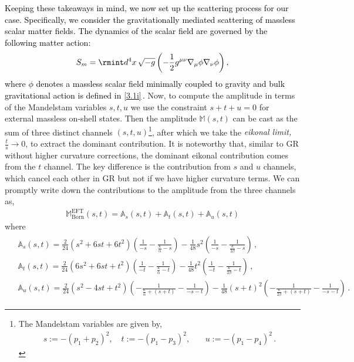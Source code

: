 \textcolor{black}{Keeping these takeaways in mind, we now set up the scattering process for our case. Specifically, we consider the gravitationally mediated scattering of massless scalar matter fields. The dynamics of the scalar field are governed by the following matter action:
\begin{align}
    S_{m} = \rmint d^4x\, \sqrt{-g} \left( -\frac{1}{2} g^{\mu\nu} \nabla_{\mu} \phi \nabla_{\nu} \phi \right),
\end{align}
where \(\phi\) denotes a massless scalar field minimally coupled to gravity and bulk gravitational action is defined in \eqref{3.1i}\,.
}
Now, to compute the amplitude in terms of the Mandelstam variables $s,t,u$ we use the constraint $s+t+u=0$ for external massless on-shell states. Then the amplitude $\mathbb{M}(s,t)$ can be cast as the sum of three distinct channels $(s,t,u)$\footnote{The Mandelstam variables are given by,
\begin{align}
s:=-(p_1+p_2)^2,\,\,\,\,\,\, t:=-(p_1-p_3)^2,\,\,\,\,\,\,\,\,\,\,\,u:=-(p_1-p_4)^2\,.
\end{align}
}, after which we take the \textit{eikonal limit, $\frac{t}{s}\rightarrow 0$}, to extract the dominant contribution.
It is noteworthy that, similar to GR without higher curvature corrections, the dominant eikonal contribution comes from the $t$ channel. The key difference is the contribution from $s$ and $u$ channels, which cancel each other in GR but not if we have higher curvature terms. We can promptly write down the  contributions to the amplitude from the three channels as,
\begin{align}
\mathbb{M}_{\text{Born}}^{\textrm{EFT}}(s,t)=\mathbb{A}_s(s,t)+\mathbb{A}_t(s,t)+\mathbb{A}_u(s,t)\nonumber
\end{align}
where
\begin{align}
\begin{split}
    &\mathbb{A}_s(s,t) =\frac{2}{24} \left(s^2+6 s t+6 t^2\right) \left(\frac{1}{-s}-\frac{1}{\frac{\kappa}{\alpha }-s}\right)-\frac{1}{48} s^2 \left(\frac{1}{-s}-\frac{1}{\frac{\kappa}{2 \beta }-s}\right)\,,\\&
\mathbb{A}_t(s,t)=\frac{2}{24} \left(6 s^2+6 s t+t^2\right) \left(\frac{1}{-t}-\frac{1}{\frac{\kappa}{\alpha }-t}\right)-\frac{1}{48} t^2 \left(\frac{1}{-t}-\frac{1}{\frac{\kappa}{2 \beta }-t}\right)\,,\\&
\mathbb{A}_u(s,t) =\frac{2}{24} \left(s^2-4 s t+t^2\right) \left(-\frac{1}{\frac{\kappa}{\alpha }+(s+t)}-\frac{1}{-s-t}\right)-\frac{1}{48} (s+t)^2 \left(-\frac{1}{\frac{\kappa}{2 \beta }+(s+t)}-\frac{1}{-s-t}\right)\,.
\end{split}
\end{align}


